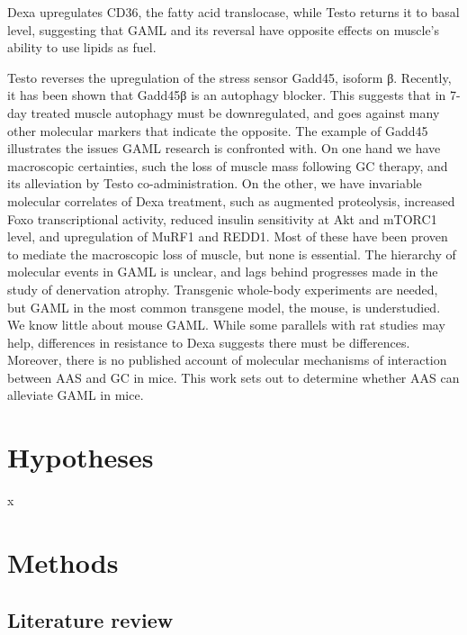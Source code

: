 \documentclass[12pt,english]{report}\usepackage[]{graphicx}\usepackage[]{color}
\begin{document}
Dexa upregulates CD36, the fatty acid translocase\citep{mcfarlan2012vivo},
while Testo returns it to basal level, suggesting that GAML and its
reversal have opposite effects on muscle's ability to use lipids as
fuel. 

Testo reverses the upregulation of the stress sensor Gadd45, isoform
β. Recently, it has been shown that Gadd45β is an autophagy blocker\citep{keil2013phosphorylation}.
This suggests that in 7-day treated muscle autophagy must be downregulated,
and goes against many other molecular markers that indicate the opposite.
The example of Gadd45 illustrates the issues GAML research is confronted
with. On one hand we have macroscopic certainties, such the loss of
muscle mass following GC therapy, and its alleviation by Testo co-administration.
On the other, we have invariable molecular correlates of Dexa treatment,
such as augmented proteolysis, increased Foxo transcriptional activity,
reduced insulin sensitivity at Akt and mTORC1 level, and upregulation
of MuRF1 and REDD1. Most of these have been proven to mediate the
macroscopic loss of muscle, but none is essential. The hierarchy of
molecular events in GAML is unclear, and lags behind progresses made
in the study of denervation atrophy. Transgenic whole-body experiments
are needed, but GAML in the most common transgene model, the mouse,
is understudied. We know little about mouse GAML. While some parallels
with rat studies may help, differences in resistance to Dexa suggests
there must be differences. Moreover, there is no published account
of molecular mechanisms of interaction between AAS and GC in mice.
This work sets out to determine whether AAS can alleviate GAML in
mice.

\begin{singlespace}
\pagebreak{}
\end{singlespace}


\chapter{Hypotheses}

x

\begin{singlespace}
\pagebreak{}
\end{singlespace}


\chapter{Methods}


\section{Literature review}
\end{document}
